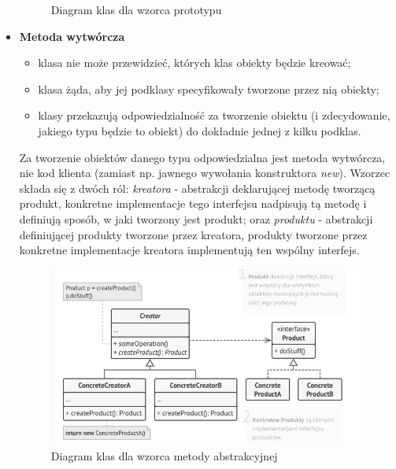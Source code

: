 \documentclass[a4paper,12pt,oneside]{book}
\begin{document}
\begin{itemize}
\begin{figure}[h]
                        \caption{Diagram klas dla wzorca prototypu}
                        \label{fig:twojastara7}
                    \end{figure}
                    \item \textbf{Metoda wytwórcza}
                    \begin{itemize}
                        \item klasa nie może przewidzieć, których klas obiekty będzie kreować;
                        \item klasa żąda, aby jej podklasy specyfikowały tworzone przez nią obiekty;
                        \item klasy przekazują odpowiedzialność za tworzenie obiektu (i zdecydowanie, jakiego typu będzie to obiekt) do 
                        dokładnie jednej z kilku podklas.
                    \end{itemize}
                    Za tworzenie obiektów danego typu odpowiedzialna jest metoda wytwórcza, nie kod klienta (zamiast np. jawnego wywołania konstruktora \textit{new}). Wzorzec składa się z dwóch ról: \textit{kreatora} - abstrakcji deklarującej metodę tworzącą produkt, konkretne implementacje tego interfejsu nadpisują tą metodę i definiują sposób, w jaki tworzony jest produkt; oraz \textit{produktu} - abstrakcji definiującej produkty tworzone przez kreatora, produkty tworzone przez konkretne implementacje kreatora implementują ten wspólny interfejs. 
                    \begin{figure}[h]
                        \centering
                        \includegraphics[width=\textwidth/2]{images/factory_method.jpg}
                        \caption{Diagram klas dla wzorca metody abstrakcyjnej}
                        \label{fig:twojastara8}
                    \end{figure}

\end{itemize}
\end{document}
